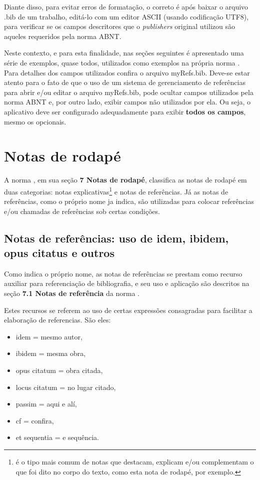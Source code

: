 \begin{apendicesenv}
Diante disso, para evitar erros de formatação, o correto é após baixar o arquivo {\ttfamily .bib} de um trabalho, editá-lo com um editor ASCII (usando codificação UTF8), para verificar se os campos descritores que o \textit{publishers} original utilizou são aqueles requeridos pela norma ABNT.

Neste contexto, e para esta finalidade, nas seções seguintes é apresentado uma série de exemplos, quase todos, utilizados como exemplos na própria norma . Para detalhes dos campos utilizados confira o arquivo {\ttfamily myRefs.bib}. Deve-se estar atento para o fato de que o uso de um sistema de gerenciamento de referências para abrir e/ou editar o arquivo {\ttfamily myRefs.bib}, pode ocultar campos utilizados pela norma ABNT e, por outro lado, exibir campos não utilizados por ela. Ou seja, o aplicativo deve ser configurado adequadamente para exibir \textbf{todos os campos}, mesmo os opcionais.

\section{Notas de rodapé}
\label{sec:notas_de_rodape}

A norma , em sua seção \textbf{7 Notas de rodapé}, classifica as notas de rodapé em duas categorias: notas explicativas\footnote{é o tipo mais comum de notas que destacam, explicam e/ou complementam o que foi dito no corpo do texto, como esta nota de rodapé, por exemplo.} e notas de referências. Já as notas de referências, como o próprio nome ja indica, são utilizadas para colocar referências e/ou chamadas de referências sob certas condições.

\subsection{Notas de referências: uso de idem, ibidem, opus citatus e outros}
\label{subsec:notas_de_referencias}

Como indica o próprio nome, as notas de referências se prestam como recurso auxiliar para referenciação de bibliografia, e seu uso e aplicação são descritos na seção \textbf{7.1 Notas de referência} da norma .

Estes recursos se referem ao uso de certas expressões consagradas para facilitar a elaboração de referencias. São eles:

\begin{itemize}
    \item idem = mesmo autor,
    \item ibidem = mesma obra,
    \item opus citatum = obra citada,
    \item locus citatum = no lugar citado,
    \item passim = aqui e alí,
    \item cf = confira,
    \item et sequentia = e sequência.
\end{itemize}


\end{apendicesenv}
